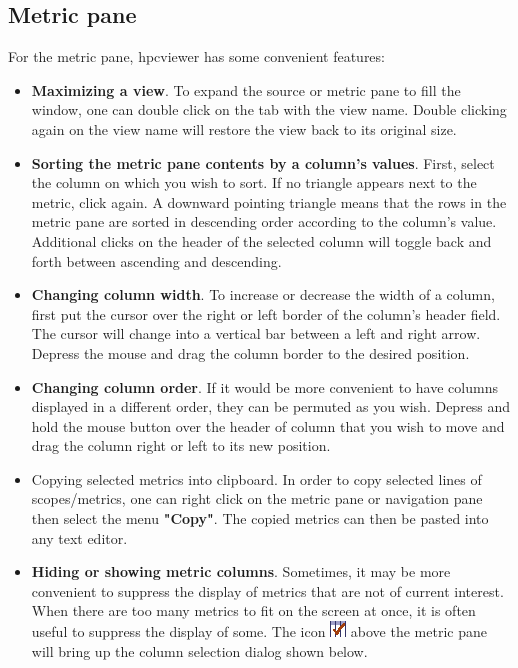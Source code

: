 \documentclass[a4paper,11pt]{article}
\begin{document}
\subsection{Metric pane}

 For the metric pane, hpcviewer has some convenient features: 
\begin{itemize}
	\item \textbf{Maximizing a view}. To expand the source or metric pane to   fill the window, one can double click on the tab with the view   name. Double clicking again on the view name will restore the view   back to its original size.   
\\
	\item \textbf{Sorting the metric pane contents by a column's  values}. First, select the column on which you wish to  sort. If no triangle appears next to the metric, click again.  A downward pointing triangle means that the rows in the metric  pane are sorted in descending order according to the column's  value. Additional clicks on the header of the selected column  will toggle back and forth between ascending and descending. 
	\item \textbf{Changing column width}. To increase or decrease the width of a column, first put the cursor over the right or left border of the column's header field. The cursor will change into a vertical bar between a left and right arrow. Depress the mouse and drag the column border to the desired position. 
	\item \textbf{Changing column order}. If it would be more convenient to have columns displayed in a different order, they can be permuted as you wish. Depress and hold the mouse button over the header of column that you wish to move and drag the column right or left to its new position. 
	\item Copying selected metrics into clipboard. In order to copy selected  lines of scopes/metrics, one can right click on the metric pane or navigation pane  then select the menu \textbf{"Copy"}. The copied metrics can then be pasted into  any text editor.  
	\item \textbf{Hiding or showing metric columns}. Sometimes, it may be more convenient to suppress the display of metrics that are not of current interest. When there are too many metrics to fit on the screen at once, it is often useful to suppress the display of some. The icon 
\includegraphics{images/checkColumns.png}  above the metric pane will bring up the column selection dialog shown below.
\end{itemize}
\end{document}
